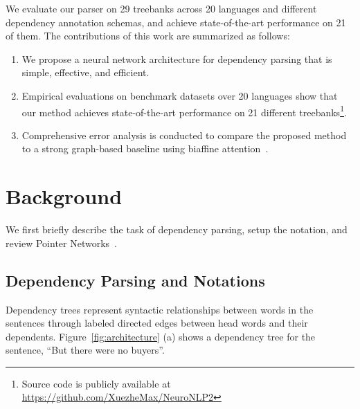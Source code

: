 \documentclass[11pt,a4paper]{article}
\begin{document}
We evaluate our parser on 29 treebanks across 20 languages and different dependency annotation schemas, and achieve state-of-the-art performance on 21 of them. 
The contributions of this work are summarized as follows: 
\begin{enumerate}[topsep=0pt,itemsep=-1.5ex,label=(\roman*)]
\item We propose a neural network architecture for dependency parsing that is simple, effective, and efficient. 
\item Empirical evaluations on benchmark datasets over 20 languages show that our method achieves state-of-the-art performance on 21 different treebanks\footnote{Source code is publicly available at \url{https://github.com/XuezheMax/NeuroNLP2}}.
\item Comprehensive error analysis is conducted to compare the proposed method to a strong graph-based baseline using biaffine attention~\citep{dozat2017:ICLR}.
\end{enumerate}

\section{Background}
\label{sec:model}
We first briefly describe the task of dependency parsing, setup the notation, and review Pointer Networks~\citep{vinyals2015pointer}.

\begin{figure*}
\centering
{}
\caption{Neural architecture for the \textsc{StackPtr} network, together with the decoding procedure of an example sentence. 
The BiRNN of the encoder is elided for brevity. 
For the inputs of decoder at each time step, vectors in red and blue boxes indicate the sibling and grandparent.}\label{fig:architecture}
\end{figure*}

\subsection{Dependency Parsing and Notations}
Dependency trees represent syntactic relationships between words in the sentences through labeled directed edges between head words 
and their dependents. 
Figure~\ref{fig:architecture} (a) shows a dependency tree for the sentence, ``But there were no buyers''.
\end{document}
